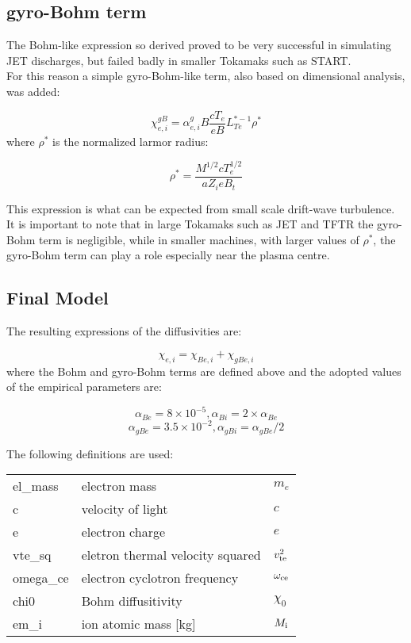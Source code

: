 \subsection{gyro-Bohm term}

The Bohm-like expression so derived proved to be very successful
in simulating JET discharges, but failed badly in smaller Tokamaks
such as START\cite{roa96}.\\
For this reason a simple gyro-Bohm-like term, also based on
dimensional analysis, was added:

\[ \chi_{e,i}^{gB} = \alpha_{e,i}^gB \frac{cT_e}{eB} L_{Te}^{*-1} \rho^*\]
where $\rho^*$ is the normalized larmor radius:

\[ \rho^* =  \frac {M^{1/2}cT_e^{1/2}}{aZ_ieB_t}\]

This expression is what can be expected from small scale
drift-wave turbulence. It is important to note that in large
Tokamaks such as JET and TFTR the gyro-Bohm term is negligible,
while in smaller machines, with larger values of $\rho^*$, the
gyro-Bohm term can play a role especially near the plasma centre.\hfill

\subsection{Final Model}
The resulting expressions of the diffusivities are:

\[ \chi_{e,i}=\chi_{Be,i}+\chi_{gBe,i}\]
where the Bohm and gyro-Bohm terms are defined above and the adopted values
of the empirical parameters are:\hfill

\[ \alpha_{Be} = 8\times10^{-5} ,\alpha_{Bi} = 2\times\alpha_{Be}\]
\[ \alpha_{gBe} = 3.5\times10^{-2} , \alpha_{gBi} = \alpha_{gBe}/2\]\vskip8pt


The following definitions are used:\vskip8pt

\begin{tabular}{lll}
el\_mass &electron mass    &$m_e$ \\
c       &velocity of light &$c$ \\
e       &electron charge  &$e$\\
vte\_sq &eletron thermal velocity squared &$v_{\rm te}^2$\\
omega\_ce &electron cyclotron frequency &$\omega_{\rm ce}$\\
chi0 &Bohm diffusitivity & $\chi_0$\\
em\_i & ion atomic mass [kg] & $M_{\rm i}$\\
\end{tabular}\vskip8pt

